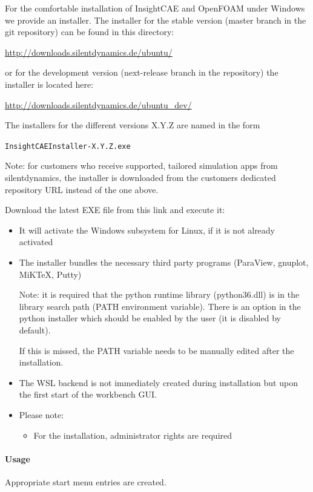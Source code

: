 For the comfortable installation of InsightCAE and OpenFOAM under Windows we provide an installer.
The installer for the stable version (master branch in the git repository) can be found in this directory:

\url{http://downloads.silentdynamics.de/ubuntu/}

or for the development version (next-release branch in the repository) the installer is located here:

\url{http://downloads.silentdynamics.de/ubuntu_dev/}

The installers for the different versions X.Y.Z are named in the form 

\texttt{InsightCAEInstaller-X.Y.Z.exe}

Note: for customers who receive supported, tailored simulation apps from silentdynamics, the installer is downloaded from the customers dedicated repository URL instead of the one above.

Download the latest EXE file from this link and execute it:

\begin{itemize}
\item It will activate the Windows subsystem for Linux, if it is not already activated
\item The installer bundles the necessary third party programs (ParaView, gnuplot, MiKTeX, Putty)

Note: it is required that the python runtime library (python36.dll) is in the library search path (PATH environment variable). There is an option in the python installer which should be enabled by the user (it is disabled by default). \warningsymbol

If this is missed, the PATH variable needs to be manually edited after the installation.
\item The WSL backend is not immediately created during installation but upon the first start of the workbench GUI.
\item Please note:
\begin{itemize}
\item For the installation, administrator rights are required
\end{itemize}
\end{itemize}

\paragraph{Usage}

Appropriate start menu entries are created.

